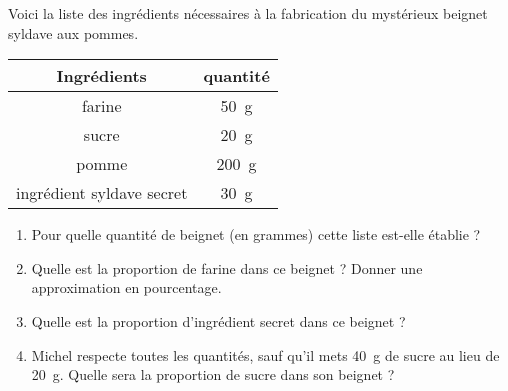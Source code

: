 
\begin{exercice}\label{exo2smath-0323}

    \begin{multicols}{2}
    Voici la liste des ingrédients nécessaires à la fabrication du mystérieux beignet syldave aux pommes.
    \begin{center}
    \begin{tabular}[]{|c||c|}
        \hline
        Ingrédients&quantité\\
        \hline\hline
        farine&\SI{50}{\gram}\\
        \hline
        sucre&\SI{20}{\gram}\\
        \hline
        pomme&\SI{200}{\gram}\\
        \hline
        ingrédient syldave secret&\SI{30}{\gram}\\
        \hline
    \end{tabular}
    \end{center}
    \begin{enumerate}
        \item
            Pour quelle quantité de beignet (en grammes) cette liste est-elle établie ?
        \item
            Quelle est la proportion de farine dans ce beignet ? Donner une approximation en pourcentage.
        \item
            Quelle est la proportion d'ingrédient secret dans ce beignet ?
        \item
            Michel respecte toutes les quantités, sauf qu'il mets \SI{40}{\gram} de sucre au lieu de \SI{20}{\gram}. Quelle sera la proportion de sucre dans son beignet ?
    \end{enumerate}
    \end{multicols}

\end{exercice}
